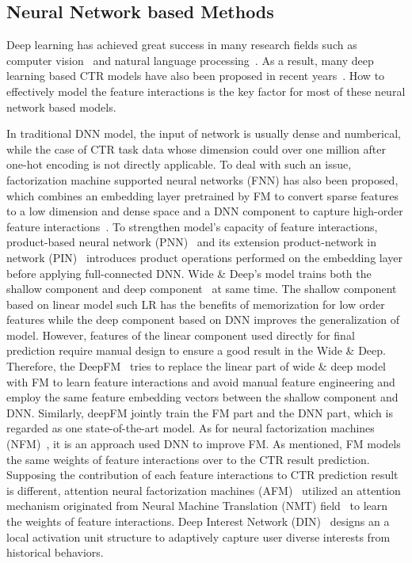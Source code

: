 \documentclass[journal]{IEEEtran}
\begin{document}
\subsection{Neural Network based Methods}
Deep learning has achieved great success in many research fields such as computer vision~\cite{61,62} and natural language processing~\cite{63}. As a result, many deep learning based CTR models have also been proposed in recent years~\cite{59,60,64}. How to effectively model the feature interactions is the key factor for most of these neural network based models. 

In traditional DNN model, the input of network is usually dense and numberical, while the case of CTR task data whose dimension could over one million after one-hot encoding is not directly applicable. To deal with such an issue, factorization machine supported neural networks (FNN) has also been proposed, which combines an embedding layer pretrained by FM to convert sparse features to a low dimension and dense space and a DNN component to capture high-order feature interactions~\cite{22}. To strengthen model’s capacity of feature interactions, product-based neural network (PNN)~\cite{29} and its extension product-network in network (PIN)~\cite{55} introduces product operations performed on the embedding layer before applying full-connected DNN. Wide \& Deep’s model trains both the shallow component and deep component~\cite{30} at same time. The shallow component based on linear model such LR has the benefits of memorization for low order features while the deep component based on DNN improves the generalization of model. However, features of the linear component used directly for final prediction require manual design to ensure a good result in the Wide \& Deep. Therefore, the DeepFM~\cite{56} tries to replace the linear part of wide \& deep model with FM to learn feature interactions and avoid manual feature engineering and employ the same feature embedding vectors between the shallow component and DNN. Similarly, deepFM jointly train the FM part and the DNN part, which is regarded as one state-of-the-art model. As for neural factorization machines (NFM)~\cite{21}, it is an approach used DNN to improve FM. As mentioned, FM models the same weights of feature interactions over to the CTR result prediction. Supposing the contribution of each feature interactions to CTR prediction result is different, attention neural factorization machines (AFM)~\cite{32} utilized an attention mechanism originated from Neural Machine Translation (NMT) field~\cite{65} to learn the weights of feature interactions. Deep Interest Network (DIN)~\cite{1} designs an a local activation unit structure to adaptively capture user diverse interests from historical behaviors.
\end{document}

